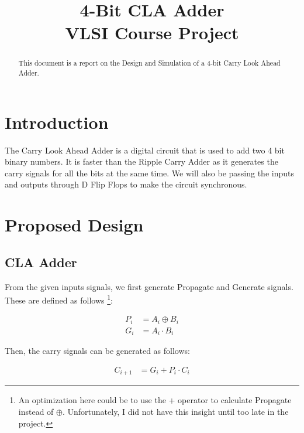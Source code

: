 \documentclass[conference]{IEEEtran}
\begin{document}
\title{4-Bit CLA Adder \\ VLSI Course Project}

\author{
}

\maketitle

\begin{abstract}
This document is a report on the Design and Simulation of a 4-bit Carry Look Ahead Adder.
\end{abstract}


\section{Introduction}
The Carry Look Ahead Adder is a digital circuit that is used to add two 4 bit binary numbers. It is faster than the Ripple Carry Adder as it generates the carry signals for all the bits at the same time. We will also be passing the inputs and outputs through D Flip Flops to make the circuit synchronous.

\section{Proposed Design}

\subsection{CLA Adder} 
\cite{b1} From the given inputs signals, we first generate Propagate and Generate signals. These are defined as follows \footnote{An optimization here could be to use the + operator to calculate Propagate instead of $\oplus$. Unfortunately, I did not have this insight until too late in the project.}:

\begin{align}
    P_i &= A_i \oplus B_i \\
    G_i &= A_i \cdot B_i
\end{align}

Then, the carry signals can be generated as follows:

\begin{align}
    C_{i+1} &= G_i + P_i \cdot C_i
\end{align}
\end{document}
